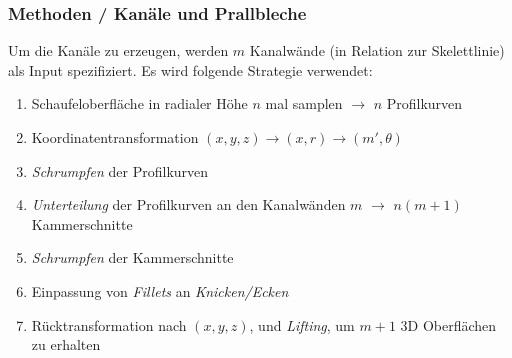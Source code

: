 \documentclass[8pt, aspectratio=169]{beamer}
\begin{document}
\begin{frame}
	\frametitle{Methoden / Kanäle und Prallbleche}
	\vspace{-1cm}\hspace{-0.5cm}
	\begin{minipage}[t]{\textwidth}
		Um die Kanäle zu erzeugen, werden $m$ Kanalwände (in Relation zur Skelettlinie) als Input spezifiziert.
		Es wird folgende Strategie verwendet:
		\begin{enumerate}
			\item Schaufeloberfläche in radialer Höhe $n$ mal samplen $\rightarrow$ $n$ Profilkurven
			\item Koordinatentransformation $(x, y, z) \rightarrow (x, r) \rightarrow (m', \theta)$
			\item \emph{Schrumpfen} der Profilkurven
			\item \emph{Unterteilung} der Profilkurven an den Kanalwänden $m$ $\rightarrow$ $n(m+1)$ Kammerschnitte 
			\item \emph{Schrumpfen} der Kammerschnitte
			\item Einpassung von \emph{Fillets} an \emph{Knicken/Ecken}
			\item Rücktransformation nach $(x, y, z)$, und \emph{Lifting}, um $m+1$ 3D Oberflächen zu erhalten
		\end{enumerate}
	\end{minipage}
	\vfill
\end{frame}
\end{document}
